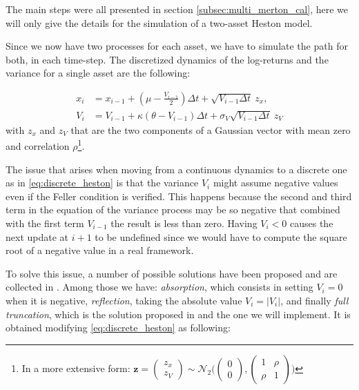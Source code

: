 The main steps were all presented in section \ref{subsec:multi_merton_cal}, here we will only give the details for the simulation of a two-asset Heston model.

Since we now have two processes for each asset, we have to simulate the path for both, in each time-step.
The discretized dynamics of the log-returns and the variance for a single asset are the following:

\begin{subequations}
	\label{eq:discrete_heston}
	\begin{align}
		x_i &= x_{i-1} + (\mu -  \frac{V_{i-1}}{2})\Delta t + \sqrt{V_{i-1} \Delta t} \:z_x, \\
		V_i &= V_{i-1} + \kappa(\theta - V_{i-1} )\Delta t + \sigma_V \sqrt{V_{i-1} \Delta t} \: z_V
	\end{align}
\end{subequations}
with $z_x$ and $z_V$ that are the two components of a Gaussian vector with mean zero and correlation $\rho$\footnote{In a more extensive form: $ \mathbf{z} = \begin{pmatrix}
	z_x\\ z_V
	\end{pmatrix} \sim \mathcal{N}_2 \Big(\begin{pmatrix}
	0\\ 0\end{pmatrix}, \begin{pmatrix}
	1& \rho\\ \rho&1
	\end{pmatrix} \Big)$}. 

The issue that arises when moving from a continuous dynamics to a discrete one as in \eqref{eq:discrete_heston} is that the variance $V_i$ might assume negative values even if the Feller condition is verified. This happens because the second and third term in the equation of the variance process may be so negative that combined with the first term $V_{i-1}$ the result is less than zero.
Having $V_i < 0$ causes the next update at $i+1$ to be undefined since we would have to compute the square root of a negative value in a real framework.

To solve this issue, a number of possible solutions have been proposed and are collected in \citep{LORD2010}. Among those we have:
\textit{absorption}, which consists in setting $V_i = 0$ when it is negative, \textit{reflection}, taking the absolute value $V_i = |V_i|$, and finally \textit{full truncation}, which is the solution proposed in \citep{LORD2010} and the one we will implement. It is obtained modifying \eqref{eq:discrete_heston} as following:

